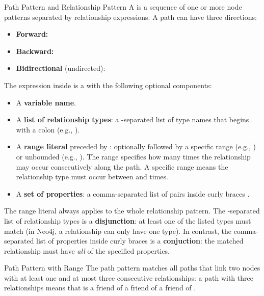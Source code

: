 \begin{definition}{Path Pattern and Relationship Pattern}
    A  is a sequence of one or more node patterns separated by relationship expressions. A path can have three directions:
    \begin{itemize}
        \item \textbf{Forward:} \code{()-[...]->()}
        \item \textbf{Backward:} \code{()<-[...]-()}
        \item \textbf{Bidirectional} (undirected): \code{()-[...]-()}
    \end{itemize}

    \noindent
    The expression inside \code{[...]} is a  with the following optional components:
    \begin{itemize}
        \item A \textbf{variable name}.
        \item A \textbf{list of relationship types}: a \code{|}-separated list of type names that begins with a colon \code{:} (e.g., ).
        \item A \textbf{range literal} preceded by \code{*}: optionally followed by a specific range  (e.g., ) or unbounded (e.g., \code{*}). The range specifies how many times the relationship may occur consecutively along the path. A specific range  means the relationship type must occur between  and  times.
        \item A \textbf{set of properties}: a comma-separated list of  pairs inside curly braces \code{\{\}}.
    \end{itemize}
\end{definition}

\begin{warning}{}
    The range literal always applies to the whole relationship pattern. The \code{|}-separated list of relationship types is a \textbf{disjunction}: at least one of the listed types must match (in Neo4j, a relationship can only have one type). 
    In contrast, the comma-separated list of properties inside curly braces is a \textbf{conjuction}: the matched relationship must have \emph{all} of the specified properties.
\end{warning}

\begin{example}{Path Pattern with Range}
    The path pattern  matches all paths that link two nodes with at least one and at most three consecutive  relationships: a path with three  relationships means that  is a friend of a friend of a friend of .
\end{example}

